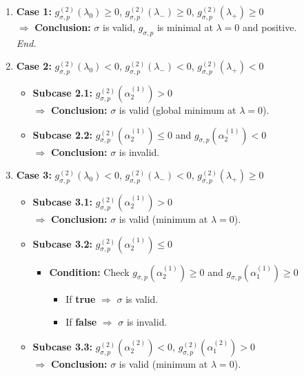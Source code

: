 \documentclass[a4paper, 10pt]{article}
\theoremstyle{definition}
\begin{document}
\begin{enumerate}
    \item \textbf{Case 1:} $g_{\sigma, p}^{(2)}(\lambda_0) \geq 0$, $g_{\sigma, p}^{(2)}(\lambda_-) \geq 0$, $g_{\sigma, p}^{(2)}(\lambda_+) \geq 0$ \\
    $\Rightarrow$ \textbf{Conclusion:} $\sigma$ is valid, $g_{\sigma, p}$ is minimal at $\lambda = 0$ and positive. \\
    \textit{End.}

    \item \textbf{Case 2:} $g_{\sigma, p}^{(2)}(\lambda_0) < 0$, $g_{\sigma, p}^{(2)}(\lambda_-) < 0$, $g_{\sigma, p}^{(2)}(\lambda_+) < 0$
    \begin{itemize}
        \item \textbf{Subcase 2.1:} $g_{\sigma, p}^{(2)}(\alpha^{(1)}_2) > 0$ \\
        $\Rightarrow$ \textbf{Conclusion:} $\sigma$ is valid (global minimum at $\lambda = 0$).
        \item \textbf{Subcase 2.2:} $g_{\sigma, p}^{(2)}(\alpha^{(1)}_2) \leq 0$ and $g_{\sigma, p}(\alpha^{(1)}_2) < 0$ \\
        $\Rightarrow$ \textbf{Conclusion:} $\sigma$ is invalid.
    \end{itemize}

    \item \textbf{Case 3:} $g_{\sigma, p}^{(2)}(\lambda_0) < 0$, $g_{\sigma, p}^{(2)}(\lambda_-) < 0$, $g_{\sigma, p}^{(2)}(\lambda_+) \geq 0$
    \begin{itemize}
        \item \textbf{Subcase 3.1:} $g_{\sigma, p}^{(2)}(\alpha^{(1)}_2) > 0$ \\
        $\Rightarrow$ \textbf{Conclusion:} $\sigma$ is valid (minimum at $\lambda = 0$).
        \item \textbf{Subcase 3.2:} $g_{\sigma, p}^{(2)}(\alpha^{(1)}_2) \leq 0$
        \begin{itemize}
            \item \textbf{Condition:} Check $g_{\sigma, p}(\alpha^{(1)}_2) \geq 0$ and $g_{\sigma, p}(\alpha^{(1)}_1) \geq 0$
            \begin{itemize}
                \item If \textbf{true} $\Rightarrow$ $\sigma$ is valid.
                \item If \textbf{false} $\Rightarrow$ $\sigma$ is invalid.
            \end{itemize}
        \end{itemize}
        \item \textbf{Subcase 3.3:} $g_{\sigma, p}^{(2)}(\alpha^{(2)}_2) < 0$, $g_{\sigma, p}^{(2)}(\alpha^{(2)}_1) > 0$ \\
        $\Rightarrow$ \textbf{Conclusion:} $\sigma$ is valid (minimum at $\lambda = 0$).
    \end{itemize}


\end{enumerate}
\end{document}

